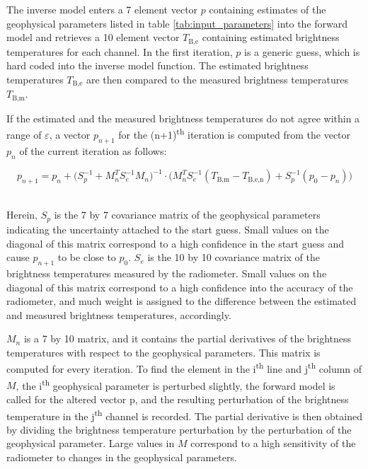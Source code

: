 \documentclass[11pt, a4paper]{article}
\begin{document}
The inverse model enters a 7 element vector \(p\) containing estimates of the geophysical parameters listed in table \ref{tab:input_parameters} into the forward model and retrieves a 10 element vector \(T_\text{B,e}\) containing estimated brightness temperatures for each channel. In the first iteration, \(p\) is a generic guess, which is hard coded into the inverse model function. The estimated brightness temperatures \(T_\text{B,e}\) are then compared to the measured brightness temperatures \(T_\text{B,m}\).
\newline

If the estimated and the measured brightness temperatures do not agree within a range of \(\varepsilon\), a vector \(p_{n+1}\) for the (n+1)\textsuperscript{th} iteration is computed from the vector \(p_n\) of the current iteration as follows:

\begin{equation*}
p_{n+1} =
p_n   +   \Big(S_p^{-1} + M_n^T S_e^{-1} M_n \Big)^{-1}   \cdot   \Big(M_n^T S_e^{-1} (T_\text{B,m} - T_\text{B,e,n}) + S_p^{-1} (p_0 - p_n) \Big)
\end{equation*}

\ \\
Herein, \(S_p\) is the 7 by 7 covariance matrix of the geophysical parameters indicating the uncertainty attached to the start guess. Small values on the diagonal of this matrix correspond to a high confidence in the start guess and cause \(p_{n+1}\) to be close to \(p_0\). \(S_e\) is the 10 by 10 covariance matrix of the brightness temperatures measured by the radiometer. Small values on the diagonal of this matrix correspond to a high confidence into the accuracy of the radiometer, and much weight is assigned to the difference between the estimated and measured brightness temperatures, accordingly.
\newline

\(M_n\) is a 7 by 10 matrix, and it contains the partial derivatives of the brightness temperatures with respect to the geophysical parameters. This matrix is computed for every iteration. To find the element in the i\textsuperscript{th} line and j\textsuperscript{th} column of \(M\), the i\textsuperscript{th} geophysical parameter is perturbed slightly, the forward model is called for the altered vector p, and the resulting perturbation of the brightness temperature in the j\textsuperscript{th} channel is recorded. The partial derivative is then obtained by dividing the brightness temperature perturbation by the perturbation of the geophysical parameter. Large values in \(M\) correspond to a high sensitivity of the radiometer to changes in the geophysical parameters.
\newline
\end{document}
